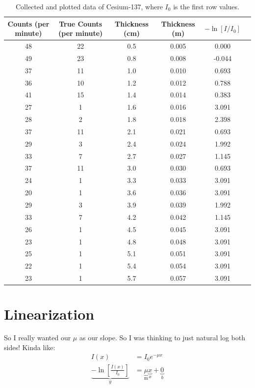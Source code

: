 \documentclass[12pt]{article}
\begin{document}
\begin{table}[H]
    \centering
    \caption{Collected and plotted data of Cesium-137, where $I_0$ is the first row values.}
    \begin{tabular}{cccccc}
        \toprule
        Counts (per minute) & True Counts (per minute) & Thickness (cm) & Thickness (m) & $-\ln[I/I_0]$ \\
        \midrule
        48 & 22 & 0.5 & 0.005 & 0.000 \\
        49 & 23 & 0.8 & 0.008 & -0.044 \\
        37 & 11 & 1.0 & 0.010 & 0.693 \\
        36 & 10 & 1.2 & 0.012 & 0.788 \\
        41 & 15 & 1.4 & 0.014 & 0.383 \\
        27 & 1 & 1.6 & 0.016 & 3.091 \\
        28 & 2 & 1.8 & 0.018 & 2.398 \\
        37 & 11 & 2.1 & 0.021 & 0.693 \\
        29 & 3 & 2.4 & 0.024 & 1.992 \\
        33 & 7 & 2.7 & 0.027 & 1.145 \\
        37 & 11 & 3.0 & 0.030 & 0.693 \\
        24 & 1 & 3.3 & 0.033 & 3.091 \\
        20 & 1 & 3.6 & 0.036 & 3.091 \\
        29 & 3 & 3.9 & 0.039 & 1.992 \\
        33 & 7 & 4.2 & 0.042 & 1.145 \\
        26 & 1 & 4.5 & 0.045 & 3.091 \\
        23 & 1 & 4.8 & 0.048 & 3.091 \\
        25 & 1 & 5.1 & 0.051 & 3.091 \\
        22 & 1 & 5.4 & 0.054 & 3.091 \\
        23 & 1 & 5.7 & 0.057 & 3.091 \\
        \bottomrule
    \end{tabular}
    \label{tab:rawdata2}
\end{table}


\section{Linearization}

So I really wanted our $\mu$ as our slope. So I was thinking to just natural log both sides! Kinda like:
\begin{align*}
    I(x) &= I_0 e^{-\mu x} \\
    \underbrace{-\ln \left[\frac{I(x)}{I_0}\right]}_{y} &= \underbrace{\mu}_{\text{m}} \underbrace{x}_{x} + \underbrace{0}_b
\end{align*}
\end{document}
